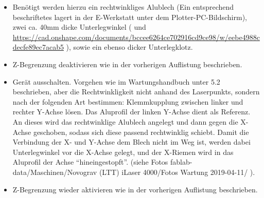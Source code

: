 \documentclass{\basedir/fablab-document}
\renewcommand{\todo}[1]{\textbf{\color{red}{TODO: #1}}}
\begin{document}
\begin{itemize}
	\item Benötigt werden hierzu ein rechtwinkliges Alublech (Ein entsprechend beschriftetes lagert in der E-Werkstatt unter dem Plotter-PC-Bildschirm), zwei ca. 40mm dicke Unterlegwinkel (\todo{noch zu fertigen, siehe Fotos fablab-data/Maschinen/Novograv (LTT) iLaser 4000/Fotos Wartung 2019-04-11/ } und \url{https://cad.onshape.com/documents/bccee6264ce702916cd9ce98/w/eebe4988cdecfe89ec7acab5} ), sowie ein ebenso dicker Unterlegklotz.
	
	\item Z-Begrenzung deaktivieren wie in der vorherigen Auflistung beschrieben.
	
	\item Gerät ausschalten. Vorgehen wie im Wartungshandbuch unter 5.2 beschrieben, aber die Rechtwinkligkeit nicht anhand des Laserpunkts, sondern nach der folgenden Art bestimmen: Klemmkupplung zwischen linker und rechter Y-Achse lösen. Das Aluprofil der linken Y-Achse dient als Referenz. An dieses wird das rechtwinklige Alublech angelegt und dann gegen die X-Achse geschoben, sodass sich diese passend rechtwinklig schiebt. Damit die Verbindung der X- und Y-Achse dem Blech nicht im Weg ist, werden dabei Unterlegwinkel vor die X-Achse gelegt, und der X-Riemen wird in das Aluprofil der Achse \enquote{hineingestopft}. (siehe Fotos fablab-data/Maschinen/Novograv (LTT) iLaser 4000/Fotos Wartung 2019-04-11/ ). 
	
	\item Z-Begrenzung wieder aktivieren wie in der vorherigen Auflistung beschrieben.
\end{itemize}
\end{document}
